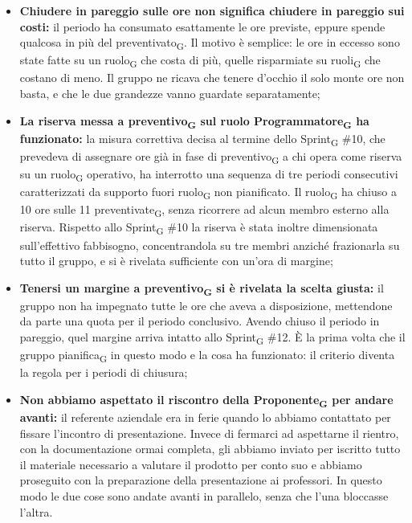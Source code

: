 ﻿\documentclass[a4paper, 10pt, colorlinks=true, linkcolor=black, urlcolor=blue, citecolor=blue, hidelinks]{article}
\begin{document}
\begin{itemize}
    \item \textbf{Chiudere in pareggio sulle ore non significa chiudere in pareggio sui costi:} il periodo ha consumato esattamente le ore previste, eppure spende qualcosa in più del preventivato\textsubscript{G}. Il motivo è semplice: le ore in eccesso sono state fatte su un ruolo\textsubscript{G} che costa di più, quelle risparmiate su ruoli\textsubscript{G} che costano di meno. Il gruppo ne ricava che tenere d'occhio il solo monte ore non basta, e che le due grandezze vanno guardate separatamente;

    \item \textbf{La riserva messa a preventivo\textsubscript{G} sul ruolo Programmatore\textsubscript{G} ha funzionato:} la misura correttiva decisa al termine dello Sprint\textsubscript{G} \#10, che prevedeva di assegnare ore già in fase di preventivo\textsubscript{G} a chi opera come riserva su un ruolo\textsubscript{G} operativo, ha interrotto una sequenza di tre periodi consecutivi caratterizzati da supporto fuori ruolo\textsubscript{G} non pianificato. Il ruolo\textsubscript{G} ha chiuso a 10 ore sulle 11 preventivate\textsubscript{G}, senza ricorrere ad alcun membro esterno alla riserva. Rispetto allo Sprint\textsubscript{G} \#10 la riserva è stata inoltre dimensionata sull'effettivo fabbisogno, concentrandola su tre membri anziché frazionarla su tutto il gruppo, e si è rivelata sufficiente con un'ora di margine;

    \item \textbf{Tenersi un margine a preventivo\textsubscript{G} si è rivelata la scelta giusta:} il gruppo non ha impegnato tutte le ore che aveva a disposizione, mettendone da parte una quota per il periodo conclusivo. Avendo chiuso il periodo in pareggio, quel margine arriva intatto allo Sprint\textsubscript{G} \#12. È la prima volta che il gruppo pianifica\textsubscript{G} in questo modo e la cosa ha funzionato: il criterio diventa la regola per i periodi di chiusura;

    \item \textbf{Non abbiamo aspettato il riscontro della Proponente\textsubscript{G} per andare avanti:} il referente aziendale era in ferie quando lo abbiamo contattato per fissare l'incontro di presentazione. Invece di fermarci ad aspettarne il rientro, con la documentazione ormai completa, gli abbiamo inviato per iscritto tutto il materiale necessario a valutare il prodotto per conto suo e abbiamo proseguito con la preparazione della presentazione ai professori. In questo modo le due cose sono andate avanti in parallelo, senza che l'una bloccasse l'altra.
\end{itemize}
\end{document}
